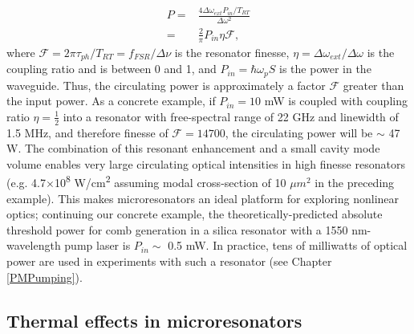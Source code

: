    \begin{align}
   P=&\frac{4\Delta\omega_{ext}P_{in}/T_{RT}}{\Delta\omega^2}\\
   =&\frac{2 }{\pi}P_{in}\eta\mathcal{F},
   \end{align}
   where $\mathcal{F}=2\pi\tau_{ph}/T_{RT}=f_{FSR}/\Delta\nu$ is the resonator finesse, $\eta=\Delta\omega_{ext}/\Delta\omega$ is the coupling ratio and is between 0 and 1, and $P_{in}=\hbar\omega_p S$ is the power in the waveguide. Thus, the circulating power is approximately a factor $\mathcal{F}$ greater than the input power. As a concrete example, if $P_{in}=10$ mW is coupled with coupling ratio $\eta=\frac{1}{2}$ into a resonator with free-spectral range of 22 GHz and linewidth of 1.5 MHz, and therefore finesse of $\mathcal{F}=14700$, the circulating power will be $\sim$ 47 W. The combination of this resonant enhancement and a small cavity mode volume enables very large circulating optical intensities in high finesse resonators (e.g. 4.7$\times$10\textsuperscript{8} W/cm\textsuperscript{2} assuming modal cross-section of 10 $\mu m^2$ in the preceding example). This makes microresonators an ideal platform for exploring nonlinear optics; continuing our concrete example, the theoretically-predicted absolute threshold power for comb generation in a silica resonator with a 1550 nm-wavelength pump laser is $P_{in}\sim$ 0.5 mW. In practice, tens of milliwatts of optical power are used in experiments with such a resonator (see Chapter \ref{PMPumping}).


\subsection{Thermal effects in microresonators} \label{sec:thermaleffects}


